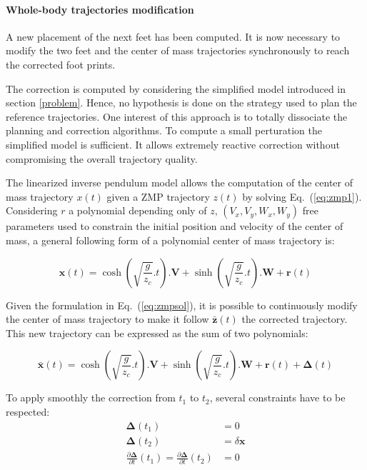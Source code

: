 \vspace{0.3cm}
\paragraph{Whole-body trajectories modification}

A new placement of the next feet has been computed. It is now necessary
to modify the two feet and the center of mass trajectories
synchronously to reach the corrected foot prints.

The correction is computed by considering the simplified model
introduced in section \ref{problem}. Hence, no hypothesis is done on
the strategy used to plan the reference trajectories. One interest of
this approach is to totally dissociate the planning and correction
algorithms. To compute a small perturation the simplified model is
sufficient. It allows extremely reactive correction without
compromising the overall trajectory quality.


The linearized inverse pendulum model allows the computation of the
center of mass trajectory $x(t)$ given a ZMP trajectory $z(t)$ by
solving Eq.~(\ref{eq:zmp1}). Considering $r$ a polynomial
depending only of $z$, $(V_x, V_y, W_x, W_y)$ free parameters used
to constrain the initial position and velocity of the center of mass,
a general following form of a polynomial center of mass trajectory is:

\begin{equation} \label{eq:zmpsol}
  \mathbf{x}(t) = \cosh(\sqrt{\frac{g}{z_c}}.t) . \mathbf{V} + \sinh(\sqrt{\frac{g}{z_c}}.t) . \mathbf{W} + \mathbf{r}(t)
\end{equation}

Given the formulation in Eq.~(\ref{eq:zmpsol}), it is possible to
continuously modify the center of mass trajectory to make it follow
\mbox{$\bar{\mathbf{z}}(t)$} the corrected trajectory. This new
trajectory can be expressed as the sum of two polynomials:

\begin{equation} \label{eq:zmpsolcor}
  \bar{\mathbf{x}}(t) = \cosh(\sqrt{\frac{g}{z_c}}.t) . \mathbf{V} +
  \sinh(\sqrt{\frac{g}{z_c}}.t) . \mathbf{W} + \mathbf{r}(t) + \mathbf{\Delta}(t)
\end{equation}

To apply smoothly the correction from $t_1$ to $t_2$, several
constraints have to be respected:
\begin{equation}
\begin{aligned}
  \mathbf{\Delta}(t_1) &= 0\\
  \mathbf{\Delta}(t_2) &= \delta \mathbf{x}\\
  \frac{\partial \mathbf{\Delta}}{\partial t}(t_1) = \frac{\partial
    \mathbf{\Delta}}{\partial t}(t_2) &= 0
\end{aligned}
\end{equation}

